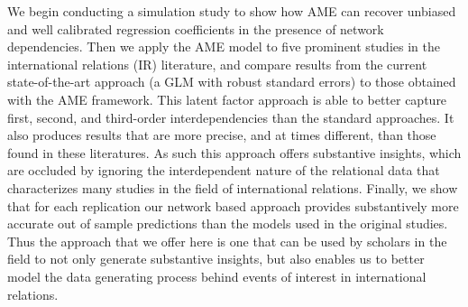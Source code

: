 We begin conducting a simulation study to show how AME can recover unbiased and well calibrated regression coefficients in the presence of network dependencies. Then we apply the AME model to five prominent studies in the international relations (IR) literature, and compare results from the current state-of-the-art approach (a GLM with robust standard errors) to those obtained with the AME framework. This latent factor approach is able to better capture first, second, and third-order interdependencies than the standard approaches. It also produces results that are more precise, and at times different, than those found in these literatures. As such this approach offers substantive insights, which are occluded by ignoring the interdependent nature of the relational data that characterizes many studies in the field of international relations. Finally, we show that for each replication our network based approach provides substantively more accurate out of sample predictions than the models used in the original studies. Thus the approach that we offer here is one that can be used by scholars in the field to not only generate substantive insights, but also enables us to better model the data generating process behind events of interest in international relations.